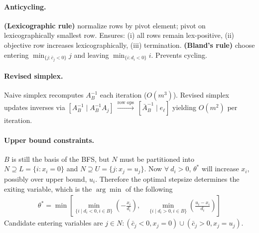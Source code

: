 \documentclass{article}
\begin{document}
\paragraph{Anticycling.}
\textbf{(Lexicographic rule)} normalize rows by pivot element; pivot on lexicographically smallest row.
Ensures: (i) all rows remain lex-positive, (ii) objective row increases lexicographically, (iii) termination.
\textbf{(Bland's rule)} choose entering $\min_{\{j:\bar c_j<0\}}j$ and leaving $\min_{\{i: d_i<0\}}i$. Prevents cycling.


\paragraph{Revised simplex.}
Naive simplex recomputes $A_B^{-1}$ each iteration ($O(m^3)$). Revised simplex updates inverses via 
$[A_B^{-1} \mid A_B^{-1}A_j]\ \xrightarrow{\text{row ops}}\ [\bar A_B^{-1} \mid e_\ell] $
yielding $O(m^2)$ per iteration.

\paragraph{Upper bound constraints.} $B$ is still the basis of the BFS, but $N$ must be partitioned into $N\supseteq L=\{i:x_i=0\}$ and $N\supseteq U=\{ j:x_j = u_j\}$. Now $\forall\ d_i > 0$, $\theta^*$ will increase $x_i$, possibly over upper bound, $u_i$. Therefore the optimal stepsize determines the exiting variable, which is the $\arg\min$ of the following
\begin{align*}
    \theta^* = \min \left[ \min_{\{i \mid d_i < 0, i\in B\}}\left(- \frac{x_i}{d_i}\right),\quad \min_{\{i \mid d_i > 0, i\in B\}}\left(\frac{u_i - x_i}{d_i}\right)\right]
\end{align*}
Candidate entering variables are $j\in N: (\bar c_j < 0, x_j = 0) \cup (\bar c_j > 0, x_j = u_j)$. 
\end{document}
